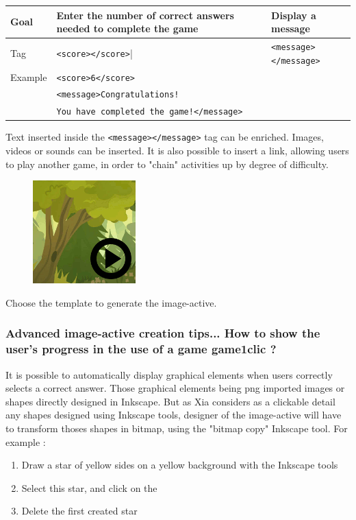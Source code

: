  \begin{tabular}{|l|p{2in}|p{2in}|}
 \hline
  Goal & Enter the number of correct answers needed to complete the game & Display a message\\
  \hline
  Tag & \texttt{<score></score>}| & \texttt{<message></message>}\\
  \hline
  Example & \multicolumn{2}{|l|}{\texttt{<score>6</score>}}\\
   & \multicolumn{2}{|l|}{\texttt{<message>Congratulations!}}\\
    & \multicolumn{2}{|l|}{\texttt{You have completed the game!</message>}}\\
  \hline
 \end{tabular}

 
\begin{astuce}
Text inserted inside the \verb|<message></message>| tag can be 
enriched. Images, videos or sounds can be inserted.
It is also possible to insert a link, allowing users to play another game,
in order to "chain" activities up by degree of difficulty.
\end{astuce}

\begin{figure}
  \centering
  \includegraphics[scale=0.7]{./images/game1clic} 
\end{figure}

Choose the template  to generate the image-active.


\subsubsection{Advanced image-active creation tips... How to show the user's progress in the use of a game game1clic ?}\label{détail_progression}


It is possible to automatically display graphical elements when users correctly 
selects a correct answer. Those graphical elements being png imported images or 
shapes directly designed in Inkscape. But as Xia considers as a clickable 
detail any shapes designed using Inkscape tools, designer of the image-active 
will have to transform thoses shapes in bitmap, using the "bitmap copy" Inkscape tool. 
For example :
\begin{enumerate}
 \item Draw  a star of yellow sides on a yellow background with the Inkscape tools 
 \item Select this star, and click on the 
 \item Delete the first created star
\end{enumerate}

